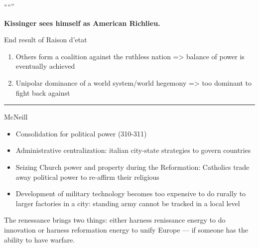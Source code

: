 \documentclass[letterpaper]{article}
\begin{document}
““”

\textbf{Kissinger sees himself as American Richlieu.}

End result of Raison d'etat

\begin{enumerate}
\item Others form a coalition against the ruthless nation => balance of
power is eventually achieved
\item Unipolar dominance of a world system/world hegemony => too dominant
to fight back against
\end{enumerate}

\noindent\rule{\textwidth}{0.5pt}

McNeill

\begin{itemize}
\item Consolidation for political power (310-311)

\item Administrative centralization: italian city-state strategies to
govern countries
\item Seizing Church power and property during the Reformation: Catholics
trade away political power to re-affirm their religious
\item Development of military technology becomes too expensive to do
rurally to larger factories in a city: standing army cannot be
tracked in a local level
\end{itemize}

The renessance brings two things: either harness renissance energy to do
innovation or harness reformation energy to unify Europe --- if someone
has the ability to have warfare.
\end{document}
